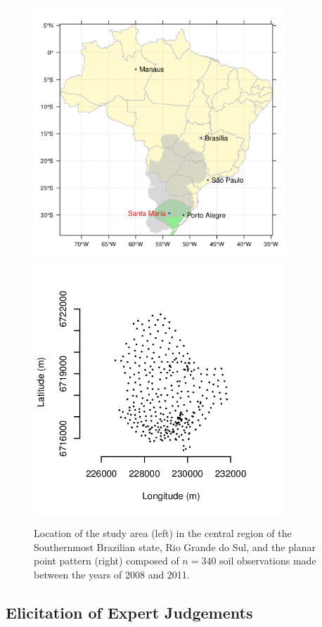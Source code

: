 \begin{figure}[!ht]
 \centering
 \includegraphics[width=95mm]{fig/chap07-location}
 \includegraphics[width=95mm]{fig/chap07-ppp}

 \caption{Location of the study area (left) in the central region of the Southernmost Brazilian state, Rio 
 Grande do Sul, and the planar point pattern (right) composed of $n = 340$ soil observations made between 
 the years of \num{2008} and \num{2011}.}
 \label{fig:chap07-chap07-location}
\end{figure}

\subsection{Elicitation of Expert Judgements}

